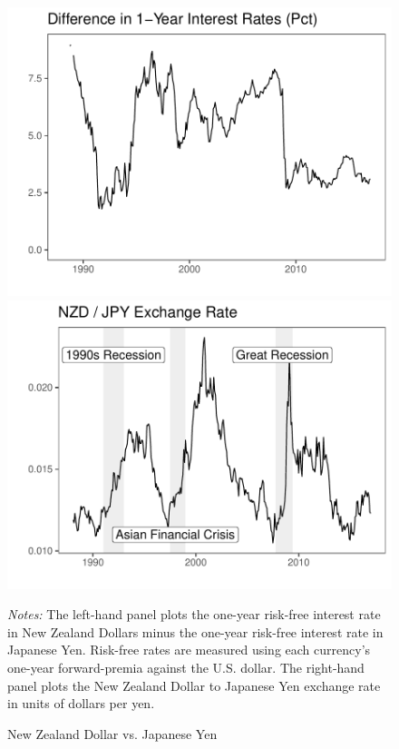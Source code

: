 \documentclass{ar-1col}
\begin{document}
\begin{figure}[htp!]
  \centering
  \caption{New Zealand Dollar vs. Japanese Yen}
  \label{fig:fp}
  \label{fig:spot}
  \begin{minipage}[htp]{0.49\textwidth}
  \includegraphics[width=\textwidth]{Exhibits/Figure_FP12M_DiffJPYNZD.pdf}
  \end{minipage}
  \begin{minipage}[htp]{0.49\textwidth}
  \includegraphics[width=\textwidth]{Exhibits/Figure_FX_JPYNZD.pdf}
  \end{minipage}
  
  \vspace{-1em}
  \begin{minipage}[htp]{\textwidth}
  \scriptsize
  \emph{Notes:} The left-hand panel plots the one-year risk-free interest rate in New Zealand Dollars minus the one-year risk-free interest rate in Japanese Yen. Risk-free rates are measured using each currency's one-year forward-premia against the U.S. dollar. The right-hand panel plots the New Zealand Dollar to Japanese Yen exchange rate in units of dollars per yen. 
  \end{minipage}
\end{figure}
\end{document}
